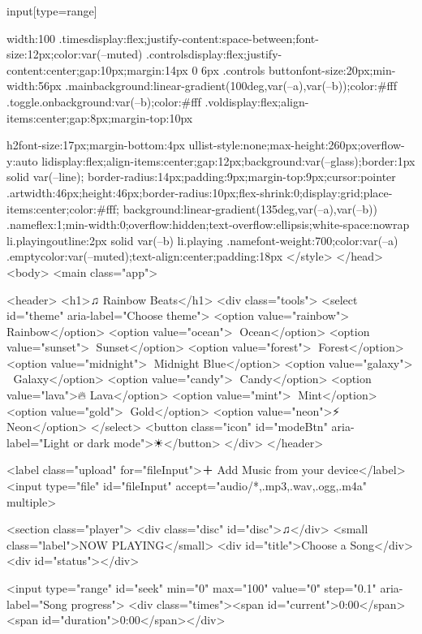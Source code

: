   input[type=range]{width:100%
  .times{display:flex;justify-content:space-between;font-size:12px;color:var(--muted)}
  .controls{display:flex;justify-content:center;gap:10px;margin:14px 0 6px}
  .controls button{font-size:20px;min-width:56px}
  .main{background:linear-gradient(100deg,var(--a),var(--b));color:#fff}
  .toggle.on{background:var(--b);color:#fff}
  .vol{display:flex;align-items:center;gap:8px;margin-top:10px}

  h2{font-size:17px;margin-bottom:4px}
  ul{list-style:none;max-height:260px;overflow-y:auto}
  li{display:flex;align-items:center;gap:12px;background:var(--glass);border:1px solid var(--line);
     border-radius:14px;padding:9px;margin-top:9px;cursor:pointer}
  .art{width:46px;height:46px;border-radius:10px;flex-shrink:0;display:grid;place-items:center;color:#fff;
       background:linear-gradient(135deg,var(--a),var(--b))}
  .name{flex:1;min-width:0;overflow:hidden;text-overflow:ellipsis;white-space:nowrap}
  li.playing{outline:2px solid var(--b)}
  li.playing .name{font-weight:700;color:var(--a)}
  .empty{color:var(--muted);text-align:center;padding:18px}
</style>
</head>
<body>
<main class="app">

  <header>
    <h1>♫ Rainbow Beats</h1>
    <div class="tools">
      <select id="theme" aria-label="Choose theme">
        <option value="rainbow">🌈 Rainbow</option>
        <option value="ocean">🌊 Ocean</option>
        <option value="sunset">🌅 Sunset</option>
        <option value="forest">🌿 Forest</option>
        <option value="midnight">🌙 Midnight Blue</option>
        <option value="galaxy">🌌 Galaxy</option>
        <option value="candy">🍭 Candy</option>
        <option value="lava">🔥 Lava</option>
        <option value="mint">🍃 Mint</option>
        <option value="gold">👑 Gold</option>
        <option value="neon">⚡ Neon</option>
      </select>
      <button class="icon" id="modeBtn" aria-label="Light or dark mode">☀</button>
    </div>
  </header>

  <label class="upload" for="fileInput">＋ Add Music from your device</label>
  <input type="file" id="fileInput" accept="audio/*,.mp3,.wav,.ogg,.m4a" multiple>

  <section class="player">
    <div class="disc" id="disc">♫</div>
    <small class="label">NOW PLAYING</small>
    <div id="title">Choose a Song</div>
    <div id="status"></div>

    <input type="range" id="seek" min="0" max="100" value="0" step="0.1" aria-label="Song progress">
    <div class="times"><span id="current">0:00</span><span id="duration">0:00</span></div>

}
